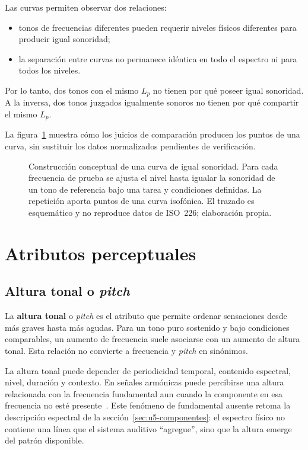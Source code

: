 Las curvas permiten observar dos relaciones:

\begin{itemize}
    \item tonos de frecuencias diferentes pueden requerir niveles físicos
    diferentes para producir igual sonoridad;
    \item la separación entre curvas no permanece idéntica en todo el espectro
    ni para todos los niveles.
\end{itemize}

Por lo tanto, dos tonos con el mismo \(L_p\) no tienen por qué poseer igual
sonoridad. A la inversa, dos tonos juzgados igualmente sonoros no tienen por
qué compartir el mismo \(L_p\).

La figura~\ref{fig:isofonicas} muestra cómo los juicios de comparación producen
los puntos de una curva, sin sustituir los datos normalizados pendientes de
verificación.

\begin{figure}[htbp]
    \centering
    
    \caption{Construcción conceptual de una curva de igual sonoridad. Para cada
    frecuencia de prueba se ajusta el nivel hasta igualar la sonoridad de un
    tono de referencia bajo una tarea y condiciones definidas. La repetición
    aporta puntos de una curva isofónica. El trazado es esquemático y no
    reproduce datos de ISO~226; elaboración propia.}
    \label{fig:isofonicas}
\end{figure}

\section{Atributos perceptuales}
\label{sec:u7-atributos}

\subsection{Altura tonal o \emph{pitch}}
\label{sec:u7-pitch}

La \textbf{altura tonal} o \emph{pitch} es el atributo que permite ordenar
sensaciones desde más graves hasta más agudas. Para un tono puro sostenido y
bajo condiciones comparables, un aumento de frecuencia suele asociarse con un
aumento de altura tonal. Esta relación no convierte a frecuencia y
\emph{pitch} en sinónimos.

La altura tonal puede depender de periodicidad temporal, contenido
espectral, nivel, duración y contexto. En señales armónicas puede percibirse
una altura relacionada con la frecuencia fundamental aun cuando la componente
en esa frecuencia no esté presente~\cite{oxenham2018}. Este fenómeno de fundamental ausente
retoma la descripción espectral de la sección~\ref{sec:u5-componentes}: el
espectro físico no contiene una línea que el sistema auditivo ``agregue'', sino
que la altura emerge del patrón disponible.

